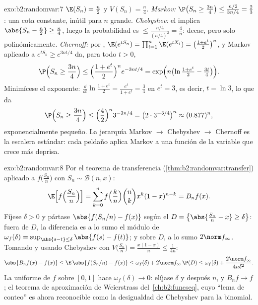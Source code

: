 \begin{solution}{exo:b2:randomvar:7}
$\E(S_n) = \frac n2$ y $V(S_n) = \frac n4$.
\emph{Markov:} $\P\bigl(S_n \geq \frac{3n}4\bigr) \leq
\frac{n/2}{3n/4} = \frac23$: una cota constante, inútil para $n$
grande.
\emph{Chebyshev:} el  implica $\abs{S_n - \frac n2} \geq \frac
n4$, luego la probabilidad es $\leq \frac{n/4}{(n/4)^2} = \frac4n$:
decae, pero solo polinómicamente.
\emph{Chernoff:} por , $\E(e^{tS_n}) =
\prod_{i=1}^n\E(e^{tX_i}) = \bigl(\frac{1 + e^t}{2}\bigr)^n$, y
Markov aplicado a $e^{tS_n} \geq e^{3nt/4}$ da, para todo $t > 0$,
\[
\P\Bigl(S_n \geq \frac{3n}4\Bigr)
\leq \Bigl(\frac{1 + e^t}{2}\Bigr)^n e^{-3nt/4}
= \exp\Bigl(n\bigl(\ln\tfrac{1 + e^t}{2} - \tfrac{3t}4\bigr)\Bigr).
\]
Minimícese el exponente: $\frac{\dd}{\dd t}\ln\frac{1+e^t}{2} =
\frac{e^t}{1 + e^t} = \frac34$ en $e^t = 3$, es decir, $t = \ln 3$,
lo que da
\[
\P\Bigl(S_n \geq \frac{3n}4\Bigr)
\leq \Bigl(\frac{4}{2}\Bigr)^n 3^{-3n/4}
= \bigl(2 \cdot 3^{-3/4}\bigr)^n \approx (0.877)^n ,
\]
exponencialmente pequeño. La jerarquía Markov $\to$ Chebyshev $\to$
Chernoff es la escalera estándar: cada peldaño aplica Markov a una
función de la variable que crece más deprisa.
\end{solution}

\begin{solution}{exo:b2:randomvar:8}
Por el teorema de transferencia (\cref{thm:b2:randomvar:transfer})
aplicado a $f\bigl(\frac{S_n}{n}\bigr)$ con $S_n \sim \mathcal{B}(n,
x)$:
\[
\E\Bigl[f\Bigl(\frac{S_n}{n}\Bigr)\Bigr]
= \sum_{k=0}^n f\Bigl(\frac kn\Bigr)\binom nk x^k(1-x)^{n-k}
= B_nf(x) .
\]
Fíjese $\delta > 0$ y pártase $\abs{f(S_n/n) - f(x)}$ según el
 $D = \bigl\{\abs{\frac{S_n}{n} - x} \geq \delta\bigr\}$:
fuera de $D$, la diferencia es a lo sumo el módulo de 
$\omega_f(\delta) = \sup_{\abs{s - t}\leq\delta}\abs{f(s) - f(t)}$; y
sobre $D$, a lo sumo $2\norm f_\infty$. Tomando  y usando
Chebyshev con $V\bigl(\frac{S_n}{n}\bigr) = \frac{x(1-x)}{n} \leq
\frac{1}{4n}$:
\[
\abs{B_nf(x) - f(x)}
\leq \E\,\abs{f(S_n/n) - f(x)}
\leq \omega_f(\delta)
+ 2\norm f_\infty\,\P(D)
\leq \omega_f(\delta) + \frac{2\norm f_\infty}{4n\delta^2} .
\]
La  uniforme de $f$ sobre $[0, 1]$ hace $\omega_f(\delta)
\to 0$: elíjase $\delta$ y después $n$, y $B_nf \to f$
; el teorema de aproximación de Weierstrass del~\cref{ch:b2:funcseq}, cuyo ``lema de conteo'' es ahora reconocible
como la desigualdad de Chebyshev para la  binomial.
\end{solution}

